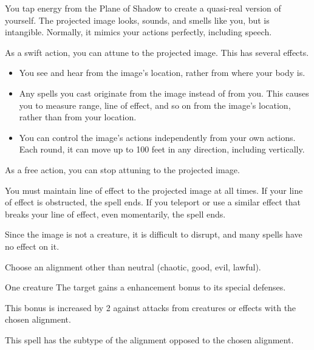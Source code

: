 \begin{spellheader}
    \spellrng{\rngmed}
    \spelldur{\durmed \dismissable}
\end{spellheader}
\begin{spelleffects}
    \spelleffect You tap energy from the Plane of Shadow to create a quasi-real version of yourself. The projected image looks, sounds, and smells like you, but is intangible. Normally, it mimics your actions perfectly, including speech.
    \par As a swift action, you can attune to the projected image. This has several effects.
    \begin{itemize}
        \item You see and hear from the image's location, rather from where your body is.
        \item Any spells you cast originate from the image instead of from you. This causes you to measure range, line of effect, and so on from the image's location, rather than from your location.
        \item You can control the image's actions independently from your own actions. Each round, it can move up to 100 feet in any direction, including vertically.
    \end{itemize}

    As a free action, you can stop attuning to the projected image.

\end{spelleffects}
\begin{spellfooter}
    \spellnotes You must maintain line of effect to the projected image at all times. If your line of effect is obstructed, the spell ends. If you teleport or use a similar effect that breaks your line of effect, even momentarily, the spell ends.

    Since the image is not a creature, it is difficult to disrupt, and many spells have no effect on it.
\end{spellfooter}

\begin{spellheader}
    \spellrng{\rngclose}
    \spelldur{\durshort \dismissable}
    \spellspecial Choose an alignment other than neutral (chaotic, good, evil, lawful).
\end{spellheader}
\begin{spelleffects}
    \begin{spelltarget}{One creature}
        \spelleffect The target gains a  enhancement bonus to its special defenses. \spellbonusscalingdescription

        This bonus is increased by 2 against attacks from creatures or effects with the chosen alignment.
    \end{spelltarget}
\end{spelleffects}
\begin{spellfooter}
    \spellnotes This spell has the subtype of the alignment opposed to the chosen alignment.
\end{spellfooter}

